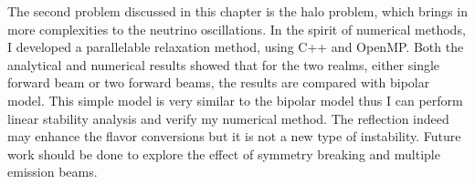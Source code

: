 The second problem discussed in this chapter is the halo problem, which brings in more complexities to the neutrino oscillations. In the spirit of numerical methods, I developed a parallelable relaxation method, using C++ and OpenMP. Both the analytical and numerical results showed that for the two realms, either single forward beam or two forward beams, the results are compared with bipolar model. This simple model is very similar to the bipolar model thus I can perform linear stability analysis and verify my numerical method. The reflection indeed may enhance the flavor conversions but it is not a new type of instability. Future work should be done to explore the effect of symmetry breaking and multiple emission beams.
